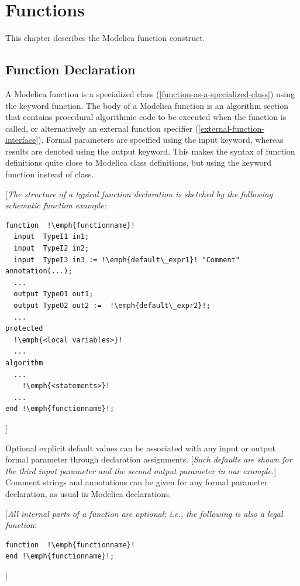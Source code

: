 \documentclass[10pt,a4paper]{report}
\def\doublelabel#1{\label{#1}\hypertarget{#1}{}}
\begin{document}
\chapter{Functions}\doublelabel{functions}

This chapter describes the Modelica function construct.

\section{Function Declaration}\doublelabel{function-declaration}

A Modelica function is a specialized class (\ref{function-as-a-specialized-class}) using the
keyword function. The body of a Modelica function is an algorithm
section that contains procedural algorithmic code to be executed when
the function is called, or alternatively an external function specifier
(\ref{external-function-interface}). Formal parameters are specified using the input keyword,
whereas results are denoted using the output keyword. This makes the
syntax of function definitions quite close to Modelica class
definitions, but using the keyword function instead of class.

{[}\emph{The structure of a typical function declaration is sketched by
the following schematic function example:}


\begin{lstlisting}[language=modelica,escapechar=!]
function  !\emph{functionname}!
  input  TypeI1 in1;  
  input  TypeI2 in2;
  input  TypeI3 in3 := !\emph{default\_expr1}! "Comment" annotation(...);   
  ...   
  output TypeO1 out1;
  output TypeO2 out2 :=  !\emph{default\_expr2}!;
  ... 
protected   
  !\emph{<local variables>}!   
  ... 
algorithm   
  ...   
    !\emph{<statements>}!   
  ... 
end !\emph{functionname}!; 
\end{lstlisting}

{]}

Optional explicit default values can be associated with any input or
output formal parameter through declaration assignments. {[}\emph{Such
defaults are shown for the third input parameter and the second output
parameter in our example.}{]} Comment strings and annotations can be
given for any formal parameter declaration, as usual in Modelica
declarations.

{[}\emph{All internal parts of a function are optional; i.e., the
following is also a legal functio}n:

\begin{lstlisting}[language=modelica,escapechar=!]
function  !\emph{functionname}!
end !\emph{functionname}!; 
\end{lstlisting}
{]}
\end{document}
